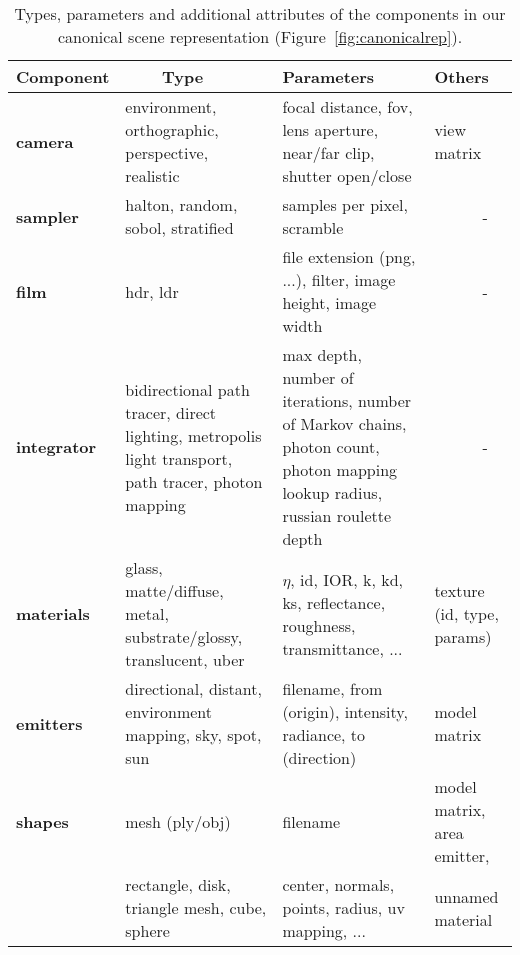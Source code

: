 \scriptsize
\begin{table}
\begin{center}
    \begin{tabular}{ | L{1.5cm} | L{2.0cm} | L{2.2cm} | L{1.4cm} | }
    \hline
    {\bf Component} & {\bf ~~~~Type} & {\bf Parameters} & {\bf Others} \\ 
    \hline
    {\bf camera} & environment, orthographic, perspective, realistic & focal distance, fov, lens aperture, near/far clip, shutter open/close & view matrix \\
    \hline
    {\bf sampler} & halton, random, sobol, stratified & samples per pixel, scramble & ~~~~~~- \\
    \hline
    {\bf film} & hdr, ldr & file extension (png, ...), filter, image height, image width & ~~~~~~- \\
    \hline
    {\bf integrator} & bidirectional path tracer, direct lighting, metropolis light transport, path tracer, photon mapping & max depth, number of iterations, number of Markov chains, photon count, photon mapping lookup radius, russian roulette depth & ~~~~~~- \\
    \hline
    {\bf materials} & glass, matte/diffuse, metal, substrate/glossy, translucent, uber & $\eta$, id, IOR, k, kd, ks, reflectance, roughness, transmittance, ... & texture (id, type, params) \\ 
    \hline
     {\bf emitters} & directional, distant, environment mapping, sky, spot, sun & filename, from (origin), intensity, radiance, to (direction) & model matrix \\
    \hline
    {\bf shapes} & mesh (ply/obj) & filename & model matrix, area emitter, \\
	   & rectangle, disk, triangle mesh, cube, sphere & center, normals, points, radius, uv mapping, ... & unnamed material\\
    \hline

    \end{tabular}
\end{center}
  \caption{Types, parameters and additional attributes of the components in our canonical scene representation (Figure~\ref{fig:canonicalrep}).} 
  \label{tab:summary}
\end{table}
\normalsize    